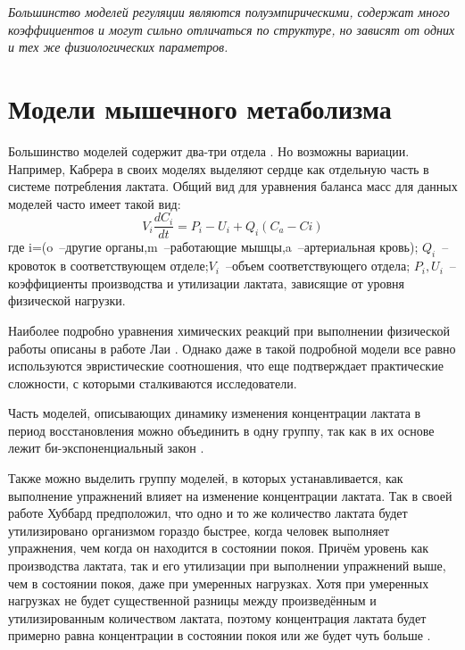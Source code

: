 \textit{Большинство моделей регуляции являются полуэмпирическими, содержат много коэффициентов и могут сильно отличаться по структуре, но зависят от одних и тех же физиологических параметров.} 

\section{Модели мышечного метаболизма}

Большинство моделей содержит два-три отдела  \cite{Fakuba1993}. Но возможны вариации. Например, Кабрера \cite{Cabrera1999} в своих моделях выделяют сердце как отдельную часть в системе потребления лактата. Общий вид для уравнения баланса масс для данных моделей часто имеет такой вид:
\begin{equation}
    V_{i}\frac{dC_{i}}{dt}=P_{i}-U_{i}+Q_{i}(C_{a}-C{i})
\end{equation}
где i=(o~--другие органы,m~--работающие мышцы,a~--артериальная кровь); $Q_{i}$~--кровоток в соответствующем отделе;$V_{i}$~--объем соответствующего отдела; $P_{i}, U_{i}$~--коэффициенты производства и утилизации лактата, зависящие от уровня физической нагрузки.

Наиболее подробно уравнения химических реакций при выполнении физической работы описаны в работе Лаи \cite{Lai2009}. Однако даже в такой подробной модели все равно используются эвристические соотношения, что еще подтверждает практические сложности, с которыми сталкиваются исследователи.

Часть моделей, описывающих динамику изменения концентрации лактата в период восстановления можно объединить в одну группу, так как в их основе лежит би-экспоненциальный закон \cite{Thomas2012,Beneke2005,Freund1990,Francaux1989}. 

Также можно выделить группу моделей, в которых устанавливается, как выполнение упражнений влияет на изменение концентрации лактата. Так в своей работе Хуббард \cite{Hubbard1973} предположил, что одно и то же количество лактата будет утилизировано организмом гораздо быстрее, когда человек выполняет упражнения, чем когда он находится в состоянии покоя. Причём уровень как производства лактата, так и его утилизации при выполнении упражнений выше, чем в состоянии покоя, даже при умеренных нагрузках. Хотя при умеренных нагрузках не будет существенной разницы между произведённым и утилизированным количеством лактата, поэтому концентрация лактата будет примерно равна концентрации в состоянии покоя или же будет чуть больше \cite{Maciejewski20013}.

